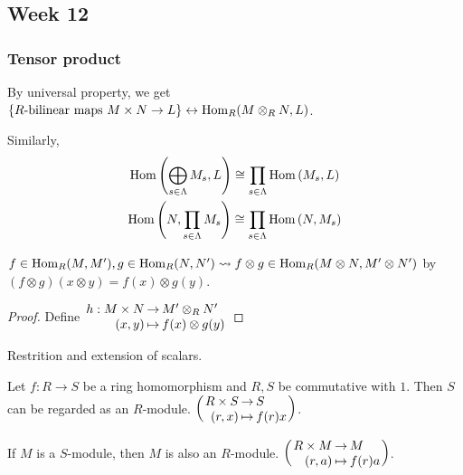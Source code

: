 \subsection{Week 12}
\subsubsection{Tensor product }

By universal property, we get
$\{ R\text{-bilinear maps~} M \times N \to L \} \leftrightarrow
\operatorname{Hom}_R(M \otimes_R N, L)$.

Similarly,
\begin{gather*}
  \operatorname{Hom}\left(\bigoplus_{s\in \Lambda} M_s, L\right) \cong
  \prod_{s\in \Lambda} \operatorname{Hom}\left(M_s, L\right) \\
  \operatorname{Hom}\left(N, \prod_{s\in \Lambda} M_s\right) \cong
  \prod_{s\in \Lambda} \operatorname{Hom}\left(N, M_s\right) \\
\end{gather*}

\begin{fact}
  $f\in \operatorname{Hom}_R(M, M'), g \in \operatorname{Hom}_R(N, N') \leadsto
  f\otimes g \in \operatorname{Hom}_R(M\otimes N, M'\otimes N')$ by
  $(f \otimes g)(x \otimes y) = f(x) \otimes g(y)$.
  \begin{proof}
    Define
    $\arraycolsep=1pt
    \begin{array}{rcl}
      h: M \times N & \to & M' \otimes_R N' \\
      (x, y) & \mapsto & f(x) \otimes g(y)
    \end{array}$
  \end{proof}
\end{fact}

Restrition and extension of scalars.

Let $f: R \to S$ be a ring homomorphism and $R, S$ be commutative with $1$.
Then $S$ can be regarded as an $R$-module.
    $\arraycolsep=1pt
    \left(\begin{array}{rcl}
      R \times S & \to & S \\
      (r, x) & \mapsto & f(r)x
    \end{array}\right)$.

If $M$ is a $S$-module, then $M$ is also an $R$-module.
    $\arraycolsep=1pt
    \left(\begin{array}{rcl}
      R \times M & \to & M \\
      (r, a) & \mapsto & f(r)a
    \end{array}\right)$.

